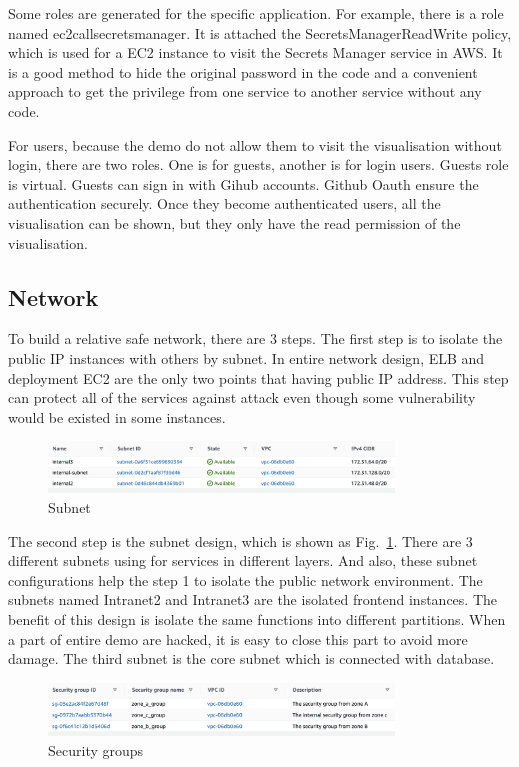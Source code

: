 \documentclass[conference]{IEEEtran}
\begin{document}
Some roles are generated for the specific application. For example, there is a role named ec2callsecretsmanager. It is attached the SecretsManagerReadWrite 
policy, which is used for a EC2 instance to visit the Secrets Manager service in AWS. It is a good method to hide the original password in the code and a 
convenient approach to get the privilege from one service to another service without any code.

For users, because the demo do not allow them to visit the visualisation without login, there are two roles. One is for guests, another is for login users. 
Guests role is virtual. Guests can sign in with Gihub accounts. Github Oauth ensure the authentication securely. Once they become authenticated users, 
all the visualisation can be shown, but they only have the read permission of the visualisation.


\subsection{Network}

To build a relative safe network, there are 3 steps. The first step is to isolate the public IP instances with others by subnet. In entire network design, 
ELB and deployment EC2 are the only two points that having public IP address. This step can protect all of the services against attack even though some vulnerability 
would be existed in some instances.

\begin{figure}[htbp]
    \centerline{\includegraphics[width=260pt]{images/subnet.png}}
    \caption{Subnet}
    \label{subnet}
\end{figure}

The second step is the subnet design, which is shown as Fig.~\ref{subnet}. There are 3 different subnets using for services in different layers. And also, 
these subnet configurations help the step 1 to isolate the public network environment. The subnets named Intranet2 and Intranet3 are the isolated frontend 
instances. The benefit of this design is isolate the same functions into different partitions. When a part of entire demo are hacked, it is easy 
to close this part to avoid more damage. The third subnet is the core subnet which is connected with database.

\begin{figure}[htbp]
    \centerline{\includegraphics[width=260pt]{images/security.png}}
    \caption{Security groups}
    \label{Security}
\end{figure}
\end{document}
